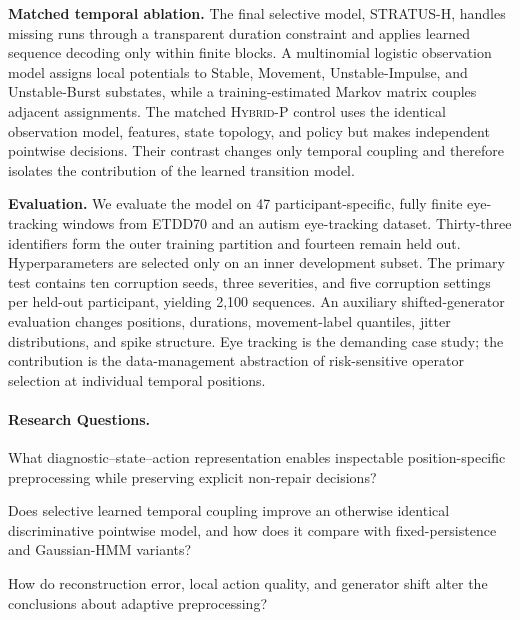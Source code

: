 \documentclass[sigconf,review]{acmart}
\newcommand{\methodHP}{\textsc{Hybrid-P}\xspace}
\newcommand{\methodH}{\textsc{STRATUS-H}\xspace}
\begin{document}
\textbf{Matched temporal ablation.} The final selective model, \methodH, handles missing runs through a transparent duration constraint and applies learned sequence decoding only within finite blocks. A multinomial logistic observation model assigns local potentials to Stable, Movement, Unstable-Impulse, and Unstable-Burst substates, while a training-estimated Markov matrix couples adjacent assignments. The matched \methodHP control uses the identical observation model, features, state topology, and policy but makes independent pointwise decisions. Their contrast changes only temporal coupling and therefore isolates the contribution of the learned transition model.

\textbf{Evaluation.} We evaluate the model on 47 participant-specific, fully finite eye-tracking windows from ETDD70 and an autism eye-tracking dataset. Thirty-three identifiers form the outer training partition and fourteen remain held out. Hyperparameters are selected only on an inner development subset. The primary test contains ten corruption seeds, three severities, and five corruption settings per held-out participant, yielding 2,100 sequences. An auxiliary shifted-generator evaluation changes positions, durations, movement-label quantiles, jitter distributions, and spike structure. Eye tracking is the demanding case study; the contribution is the data-management abstraction of risk-sensitive operator selection at individual temporal positions.

\paragraph{Research Questions.}
\begin{description}[leftmargin=0pt,labelindent=0pt]
    \item[RQ1] What diagnostic--state--action representation enables inspectable position-specific preprocessing while preserving explicit non-repair decisions?
    \item[RQ2] Does selective learned temporal coupling improve an otherwise identical discriminative pointwise model, and how does it compare with fixed-persistence and Gaussian-HMM variants?
    \item[RQ3] How do reconstruction error, local action quality, and generator shift alter the conclusions about adaptive preprocessing?
\end{description}
\end{document}
